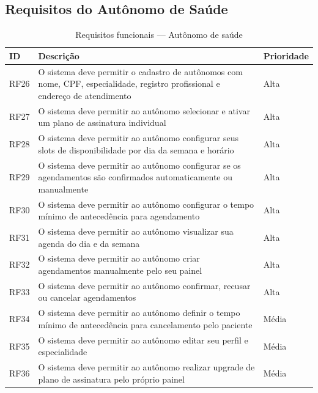 \subsection{Requisitos do Autônomo de Saúde}
\label{subsec:professional-requirements}

\begin{table}[H]
  \centering
  \caption{Requisitos funcionais --- Autônomo de saúde}
  \label{tab:professional-requirements}
  \begin{tabular}{p{1.2cm}p{7cm}p{2cm}}
    \toprule
    \textbf{ID} &
    \textbf{Descrição} &
    \textbf{Prioridade} \\
    \midrule
    RF26 & O sistema deve permitir o cadastro de
           autônomos com nome, CPF, especialidade,
           registro profissional e endereço de
           atendimento
         & Alta \\
    RF27 & O sistema deve permitir ao autônomo
           selecionar e ativar um plano de
           assinatura individual
         & Alta \\
    RF28 & O sistema deve permitir ao autônomo
           configurar seus slots de disponibilidade
           por dia da semana e horário
         & Alta \\
    RF29 & O sistema deve permitir ao autônomo
           configurar se os agendamentos são
           confirmados automaticamente ou
           manualmente
         & Alta \\
    RF30 & O sistema deve permitir ao autônomo
           configurar o tempo mínimo de
           antecedência para agendamento
         & Alta \\
    RF31 & O sistema deve permitir ao autônomo
           visualizar sua agenda do dia e
           da semana
         & Alta \\
    RF32 & O sistema deve permitir ao autônomo
           criar agendamentos manualmente
           pelo seu painel
         & Alta \\
    RF33 & O sistema deve permitir ao autônomo
           confirmar, recusar ou cancelar
           agendamentos
         & Alta \\
    RF34 & O sistema deve permitir ao autônomo
           definir o tempo mínimo de antecedência
           para cancelamento pelo paciente
         & Média \\
    RF35 & O sistema deve permitir ao autônomo
           editar seu perfil e especialidade
         & Média \\
    RF36 & O sistema deve permitir ao autônomo
           realizar upgrade de plano de
           assinatura pelo próprio painel
         & Média \\
    \bottomrule
  \end{tabular}
\end{table}

